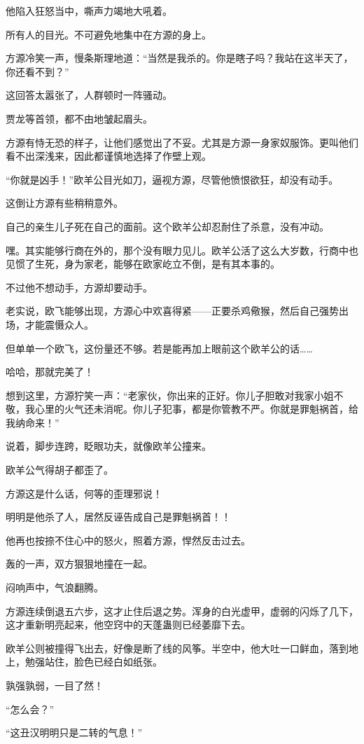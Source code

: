 \begin{this_body}
他陷入狂怒当中，嘶声力竭地大吼着。

所有人的目光。不可避免地集中在方源的身上。

方源冷笑一声，慢条斯理地道：“当然是我杀的。你是瞎子吗？我站在这半天了，你还看不到？”

这回答太嚣张了，人群顿时一阵骚动。

贾龙等首领，都不由地皱起眉头。

方源有恃无恐的样子，让他们感觉出了不妥。尤其是方源一身家奴服饰。更叫他们看不出深浅来，因此都谨慎地选择了作壁上观。

“你就是凶手！”欧羊公目光如刀，逼视方源，尽管他愤恨欲狂，却没有动手。

这倒让方源有些稍稍意外。

自己的亲生儿子死在自己的面前。这个欧羊公却忍耐住了杀意，没有冲动。

嘿。其实能够行商在外的，那个没有眼力见儿。欧羊公活了这么大岁数，行商中也见惯了生死，身为家老，能够在欧家屹立不倒，是有其本事的。

不过他不想动手，方源却要动手。

老实说，欧飞能够出现，方源心中欢喜得紧——正要杀鸡儆猴，然后自己强势出场，才能震慑众人。

但单单一个欧飞，这份量还不够。若是能再加上眼前这个欧羊公的话……

哈哈，那就完美了！

想到这里，方源狞笑一声：“老家伙，你出来的正好。你儿子胆敢对我家小姐不敬，我心里的火气还未消呢。你儿子犯事，都是你管教不严。你就是罪魁祸首，给我纳命来！”

说着，脚步连跨，眨眼功夫，就像欧羊公撞来。

欧羊公气得胡子都歪了。

方源这是什么话，何等的歪理邪说！

明明是他杀了人，居然反诬告成自己是罪魁祸首！！

他再也按捺不住心中的怒火，照着方源，悍然反击过去。

轰的一声，双方狠狠地撞在一起。

闷响声中，气浪翻腾。

方源连续倒退五六步，这才止住后退之势。浑身的白光虚甲，虚弱的闪烁了几下，这才重新明亮起来，他空窍中的天蓬蛊则已经萎靡下去。

欧羊公则被撞得飞出去，好像是断了线的风筝。半空中，他大吐一口鲜血，落到地上，勉强站住，脸色已经白如纸张。

孰强孰弱，一目了然！

“怎么会？”

“这丑汉明明只是二转的气息！”


\end{this_body}
